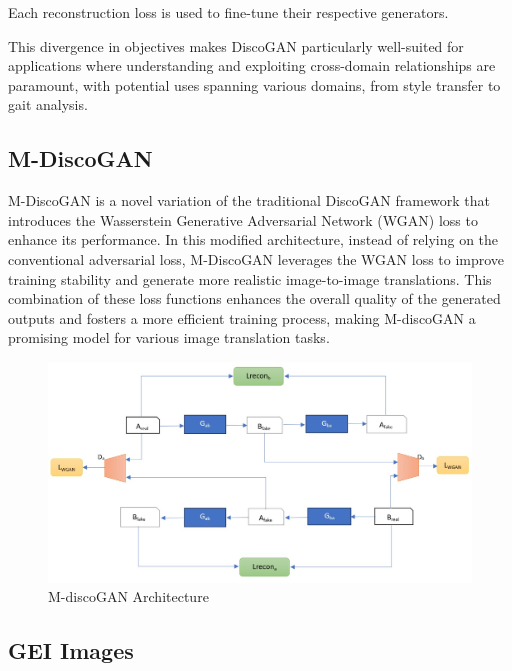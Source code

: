 \documentclass[12pt,a4paper]{article}
\begin{document}
Each reconstruction loss is used to fine-tune their respective generators. 


This divergence in objectives makes DiscoGAN particularly well-suited for applications where understanding and exploiting cross-domain relationships are paramount, with potential uses spanning various domains, from style transfer to gait analysis.

 
\subsection{M-DiscoGAN}
M-DiscoGAN is a novel variation of the traditional DiscoGAN framework that introduces the Wasserstein Generative Adversarial Network (WGAN) loss to enhance its performance. In this modified architecture, instead of relying on the conventional adversarial loss, M-DiscoGAN leverages the WGAN loss to improve training stability and generate more realistic image-to-image translations. This combination of these loss functions enhances the overall quality of the generated outputs and fosters a more efficient training process, making M-discoGAN a promising model for various image translation tasks.

\begin{figure}[!h]
  \centering
\includegraphics[scale = 0.5]{images/M-discoGAN.jpg}
  \caption{M-discoGAN Architecture}
  \label{fig:cycleWGAN}
\end{figure}

\clearpage
\subsection{GEI Images}
\end{document}

